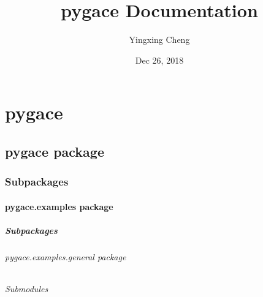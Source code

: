 \documentclass[letterpaper,10pt,english]{sphinxmanual}
\title{pygace Documentation}
\date{Dec 26, 2018}
\author{Yingxing Cheng}
\begin{document}
\maketitle
\sphinxtableofcontents
{}\label{\detokenize{index::doc}}



\chapter{pygace}
\label{\detokenize{modules::doc}}\label{\detokenize{modules:welcome-to-pygace-s-documentation}}\label{\detokenize{modules:pygace}}

\section{pygace package}
\label{\detokenize{pygace:pygace-package}}\label{\detokenize{pygace::doc}}

\subsection{Subpackages}
\label{\detokenize{pygace:subpackages}}

\subsubsection{pygace.examples package}
\label{\detokenize{pygace.examples::doc}}\label{\detokenize{pygace.examples:pygace-examples-package}}

\paragraph{Subpackages}
\label{\detokenize{pygace.examples:subpackages}}

\subparagraph{pygace.examples.general package}
\label{\detokenize{pygace.examples.general:pygace-examples-general-package}}\label{\detokenize{pygace.examples.general::doc}}

\subparagraph{Submodules}
\label{\detokenize{pygace.examples.general:submodules}}
\end{document}
